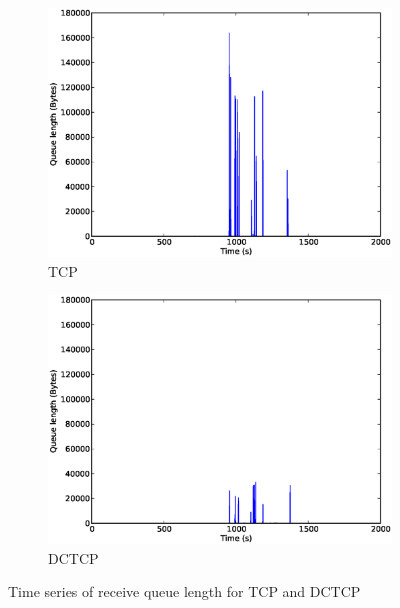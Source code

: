 \documentclass[a4paper,12pt,twoside,openright]{report}
\begin{document}
\begin{figure}[h!]
        \begin{subfigure}[b]{0.49\textwidth}
                \centering
                \includegraphics[width=\textwidth]{q_tcp.eps}
                \caption{TCP}
                \label{fig:tcpq}
        \end{subfigure}%
        \begin{subfigure}[b]{0.49\textwidth}
                \centering
                \includegraphics[width=\textwidth]{q_dctcp.eps}
                \caption{DCTCP}
                \label{fig:dctcpq}
        \end{subfigure}
        \caption{Time series of receive queue length for TCP and DCTCP}
        \label{chap:eval:sec:ciel:fig:queue}
\end{figure}
\end{document}
